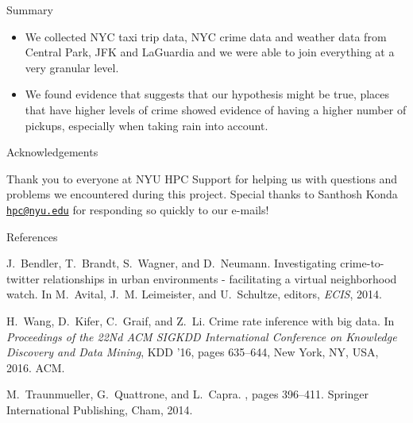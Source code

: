 \documentclass[10pt,ignorenonframetext,]{beamer}
\begin{document}
\begin{frame}{%
\protect\hypertarget{summary}{%
Summary}}

\begin{itemize}
\item
  We collected NYC taxi trip data, NYC crime data and weather data from
  Central Park, JFK and LaGuardia and we were able to join everything at
  a very granular level.
\item
  We found evidence that suggests that our hypothesis might be true,
  places that have higher levels of crime showed evidence of having a
  higher number of pickups, especially when taking rain into account.
\end{itemize}

\end{frame}

\begin{frame}{%
\protect\hypertarget{acknowledgements}{%
Acknowledgements}}

Thank you to everyone at NYU HPC Support for helping us with questions
and problems we encountered during this project. Special thanks to
Santhosh Konda \href{mailto:hpc@nyu.edu}{\nolinkurl{hpc@nyu.edu}} for
responding so quickly to our e-mails!

\end{frame}

\begin{frame}{%
\protect\hypertarget{references}{%
References}}

\begin{thebibliography}{1}

J.~Bendler, T.~Brandt, S.~Wagner, and D.~Neumann.
\newblock Investigating crime-to-twitter relationships in urban environments -
  facilitating a virtual neighborhood watch.
\newblock In M.~Avital, J.~M. Leimeister, and U.~Schultze, editors, {\em ECIS},
  2014.

H.~Wang, D.~Kifer, C.~Graif, and Z.~Li.
\newblock Crime rate inference with big data.
\newblock In {\em Proceedings of the 22Nd ACM SIGKDD International Conference
  on Knowledge Discovery and Data Mining}, KDD '16, pages 635--644, New York,
  NY, USA, 2016. ACM.

M.~Traunmueller, G.~Quattrone, and L.~Capra.
, pages 396--411.
\newblock Springer International Publishing, Cham, 2014.
\end{thebibliography}

\end{frame}
\end{document}
